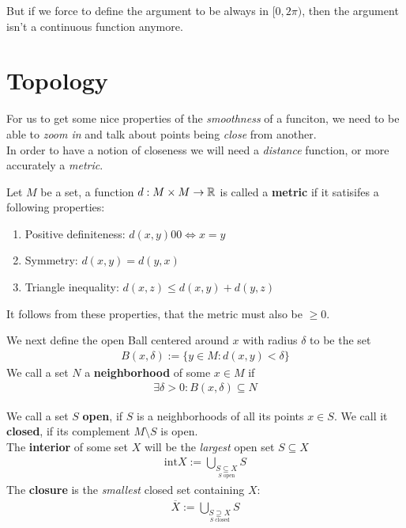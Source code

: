 But if we force to define the argument to be always in $[0, 2\pi)$, then the argument isn't a continuous function anymore.\\

\section{Topology}
For us to get some nice properties of the \emph{smoothness} of a funciton, we need to be able to \emph{zoom in} and talk about points being \emph{close} from another. \\
In order to have a notion of closeness we will need a \emph{distance} function, or more accurately a \emph{metric}.

\begin{definition}
	Let $M$ be a set, a function $d: M \times M \to \mathbb{R}$ is called a \textbf{metric} if it satisifes a following properties:
	\begin{enumerate}
		\item 	Positive definiteness: $d(x,y) 0 0 \iff x = y$
		\item 	Symmetry: $d(x,y) = d(y,x)$
		\item 	Triangle inequality: $d(x,z) \leq d(x,y) + d(y,z)$
	\end{enumerate}
\end{definition}

It follows from these properties, that the metric must also be $\geq 0$.

We next define the open Ball centered around $x$ with radius $\delta$ to be the set
\begin{align*}
	B(x,\delta) := \{y \in M: d(x,y) < \delta\}
\end{align*}
We call a set $N$ a \textbf{neighborhood} of some $x \in M$ if
\begin{align*}
	\exists \delta > 0: B(x,\delta) \subseteq N
\end{align*}

We call a set $S$ \textbf{open}, if $S$ is a neighborhoods of all its points $x \in S$. We call it \textbf{closed}, if its complement $M \setminus S$ is open.\\

The \textbf{interior} of some set $X$ will be the \emph{largest} open set $S \subseteq X$
\begin{align*}
	\text{int} X := \bigcup_{\underset{S \text{ open}}{S \subseteq X}} S
\end{align*}
The \textbf{closure} is the \emph{smallest} closed set containing $X$:
\begin{align*}
	\overline{X} := \bigcup_{\underset{S \text{ closed}}{S \supseteq X}}S
\end{align*}

